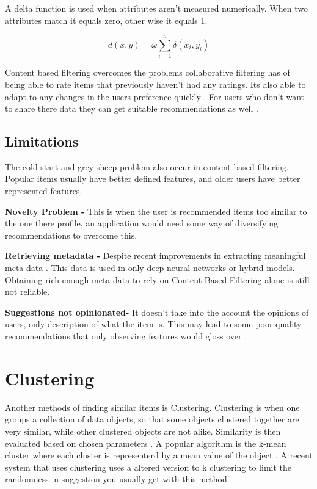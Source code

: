 A delta function is used when attributes aren't measured numerically. When two attributes match it equals zero, other wise it equals 1.

\begin{equation}
	d(x,y) = \omega \sum _{ i = 1 } ^{ n } \delta (x _{i}, y _{i})
\end{equation}

Content based filtering overcomes the problems collaborative filtering has of being able to rate items that previously haven't had any ratings. Its also able to adapt to any changes in the users preference quickly \citep{isinkaye_recommendation_2015}. For users who don't want to share there data they can get suitable recommendations as well \citep{k_you_2006}.

\subsection{Limitations}
The cold start and grey sheep problem also occur in content based filtering. Popular items usually have better defined features, and older users have better represented features.

\textbf{Novelty Problem - } This is when the user is recommended items too similar to the one there profile, an application would need some way of diversifying recommendations to overcome this.

\textbf{Retrieving metadata - } Despite recent improvements in extracting meaningful meta data \citep{vall_feature-combination_2019} \citep{singh_novel_2022}. This data is used in only deep neural networks or hybrid models. Obtaining rich enough meta data to rely on Content Based Filtering alone is still not reliable.

\textbf{Suggestions not opinionated- } It doesn't take into the account the opinions of users, only description of what the item is. This may lead to some poor quality recommendations that only observing features would gloss over \citep{celma_recommendation_2010}.  

\section{Clustering}

Another methods of finding similar items is Clustering. Clustering is when one  groups a collection of data objects, so that some objects clustered together are very similar, while other clustered objects are not alike. Similarity is then evaluated based on chosen parameters \citep{ferretti_clustering_2018}. A popular algorithm is the k-mean cluster where each cluster is representerd by a mean value of the object \citep{han_data_2006}. A recent system that uses clustering uses a altered version to k clustering to limit the randomness in suggestion you usually get with this method \citep{chang_personalized_2017}.


